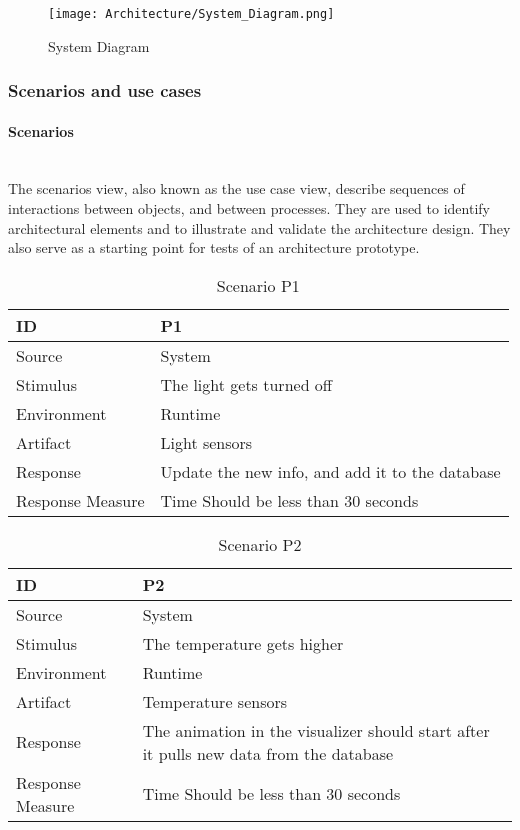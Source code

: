 \documentclass[../document.tex]{subfiles}
\begin{document}
\begin{figure}[H]
\centering
\texttt{[image: Architecture/System\_Diagram.png]}
\caption{System Diagram}
\end{figure}

\subsubsection{Scenarios and use cases}
\paragraph{Scenarios} \ \\
The scenarios view, also known as the use case view, describe sequences of interactions between objects, and between processes. They are used to identify architectural elements and to illustrate and validate the architecture design. They also serve as a starting point for tests of an architecture prototype.

\begin{table}[H]
\caption{Scenario P1}
\begin{tabularx}{\textwidth}{|X|X|}
\hline
ID
&
P1
\\ \hline
Source
&
System
\\ \hline
Stimulus
&
The light gets turned off
\\ \hline
Environment
&
Runtime
\\ \hline
Artifact
&
Light sensors
\\ \hline
Response
&
Update the new info, and add it to the database
\\ \hline
Response Measure
&
Time \newline
Should be less than 30 seconds
\\ \hline
\end{tabularx}
\end{table}

\begin{table}[H]
\caption{Scenario P2}
\begin{tabularx}{\textwidth}{|X|X|}
\hline
ID
&
P2
\\ \hline
Source
&
System
\\ \hline
Stimulus
&
The temperature gets higher
\\ \hline
Environment
&
Runtime
\\ \hline
Artifact
&
Temperature sensors
\\ \hline
Response
&
The animation in the visualizer should start after it pulls new data from the database
\\ \hline
Response Measure
&
Time\newline
Should be less than 30 seconds
\\ \hline
\end{tabularx}
\end{table}
\end{document}
